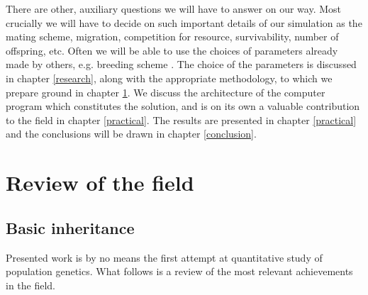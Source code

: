\documentclass{l4proj}
\newif\ifdebug
\begin{document}
There are other, auxiliary questions we will have to answer on our way. Most crucially we will have to decide on such important details of our simulation as the mating scheme, migration, competition for resource, survivability, number of offspring, etc. Often we will be able to use the choices of parameters already made by others, e.g. breeding scheme \parencite{peng10}. The choice of the parameters is discussed in chapter \ref{research}, along with the appropriate methodology, to which we prepare ground in chapter \ref{review}. We discuss the architecture of the computer program which constitutes the solution, and is on its own a valuable contribution to the field in chapter \ref{practical}. The results are presented in chapter \ref{practical} and the conclusions will be drawn in chapter \ref{conclusion}.

\chapter{Review of the field}\label{review}

\ifdebug
  This should be a critical survey of the relevant literature, adhering to normal academic conventions in citing references, etc. Here I need to discuss coalescent method vs. forward-in time method vs. sample-based methods.

explain trait, explain mendelian genetics, explain homozygous, heterozygous, dominant, sweep, polymorphism example of polymorphism: impression of bitterness while eating brussel sprouts, linkage equilibrium, panmictic population, allele, epigenetics, probability density function.
\fi

\section{Basic inheritance}

Presented work is by no means the first attempt at quantitative study of population genetics. What follows is a review of the most relevant achievements in the field.
\end{document}
